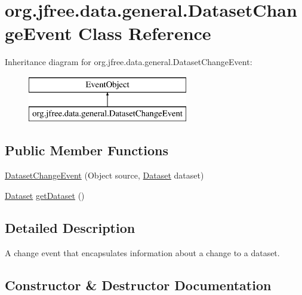 \hypertarget{classorg_1_1jfree_1_1data_1_1general_1_1_dataset_change_event}{}\section{org.\+jfree.\+data.\+general.\+Dataset\+Change\+Event Class Reference}
\label{classorg_1_1jfree_1_1data_1_1general_1_1_dataset_change_event}
Inheritance diagram for org.\+jfree.\+data.\+general.\+Dataset\+Change\+Event\+:\begin{figure}[H]
\begin{center}
\leavevmode
\includegraphics[height=2.000000cm]{classorg_1_1jfree_1_1data_1_1general_1_1_dataset_change_event}
\end{center}
\end{figure}
\subsection*{Public Member Functions}
\begin{DoxyCompactItemize}
\item 
\mbox{\hyperlink{classorg_1_1jfree_1_1data_1_1general_1_1_dataset_change_event_a3fc1eb4a5d2030b12e593dd374bf540b}{Dataset\+Change\+Event}} (Object source, \mbox{\hyperlink{interfaceorg_1_1jfree_1_1data_1_1general_1_1_dataset}{Dataset}} dataset)
\item 
\mbox{\hyperlink{interfaceorg_1_1jfree_1_1data_1_1general_1_1_dataset}{Dataset}} \mbox{\hyperlink{classorg_1_1jfree_1_1data_1_1general_1_1_dataset_change_event_ad775b83cdff537ec5eb5ff53316986c7}{get\+Dataset}} ()
\end{DoxyCompactItemize}


\subsection{Detailed Description}
A change event that encapsulates information about a change to a dataset. 

\subsection{Constructor \& Destructor Documentation}
\mbox{\label{classorg_1_1jfree_1_1data_1_1general_1_1_dataset_change_event_a3fc1eb4a5d2030b12e593dd374bf540b}} 
